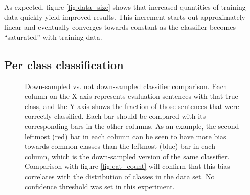\documentclass[a4paper,11pt]{kth-mag}
\begin{document}
As expected, figure \ref {fig:data_size} shows that increased quantities of training data quickly yield improved results. This increment starts out approximately linear and eventually converges towards constant as the classifier becomes ``saturated'' with training data. %

\pagebreak

\subsection{Per class classification}
\label{sec:per_cat}
\begin{figure}[h]
  \centering
  \caption{Down-sampled vs. not down-sampled classifier comparison. Each column on the X-axis represents evaluation sentences with that true class, and the Y-axis shows the fraction of those sentences that were correctly classified.
    Each bar should be compared with its corresponding bars in the other columns. As an example, the second leftmost (red) bar in each column can be seen to have more bias towards common classes than the leftmost (blue) bar in each column, which is the down-sampled version of the same classifier. Comparison with figure \ref{fig:cat_count} will confirm that this bias correlates with the distribution of classes in the data set. No confidence threshold was set in this experiment.}
  \label{fig:per_cat}
\end{figure}
\end{document}
